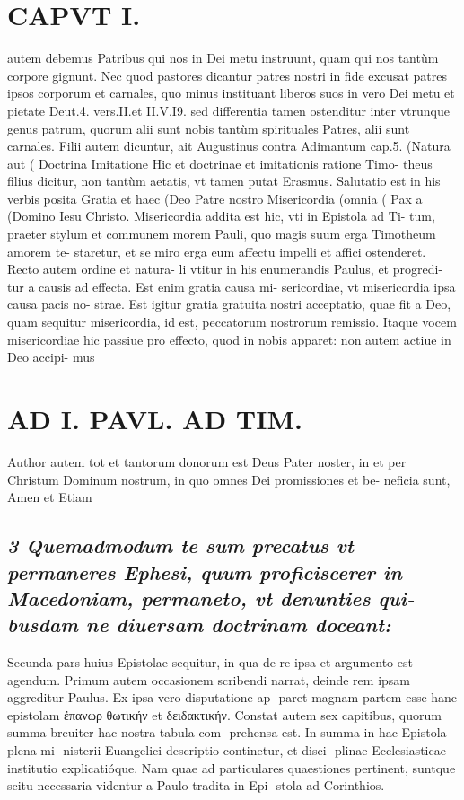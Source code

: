 \documentclass{article}
\begin{document}
\begin{pages}
\section*{CAPVT I. }
\marginpar{[ p.5 ]}\pstart autem debemus Patribus qui nos in Dei metu instruunt, quam qui nos tantùm corpore gignunt. Nec quod pastores dicantur patres nostri in fide excusat patres ipsos corporum et carnales, quo minus instituant liberos suos in vero Dei metu et pietate Deut.4. vers.II.et II.V.I9. sed differentia tamen ostenditur inter vtrunque genus patrum, quorum alii sunt nobis tantùm spirituales Patres, alii sunt carnales.  \pend\pstart Filii autem dicuntur, ait Augustinus contra Adimantum cap.5. (Natura aut ( Doctrina Imitatione Hic et doctrinae et imitationis ratione Timo- theus filius dicitur, non tantùm aetatis, vt tamen putat Erasmus. Salutatio est in his verbis posita Gratia et haec (Deo Patre nostro Misericordia (omnia ( Pax a (Domino Iesu Christo. Misericordia addita est hic, vti in Epistola ad Ti- tum, praeter stylum et communem morem Pauli, quo magis suum erga Timotheum amorem te- staretur, et se miro erga eum affectu impelli et affici ostenderet. Recto autem ordine et natura- li vtitur in his enumerandis Paulus, et progredi- tur a causis ad effecta. Est enim gratia causa mi- sericordiae, vt misericordia ipsa causa pacis no- strae. Est igitur gratia gratuita nostri acceptatio, quae fit a Deo, quam sequitur misericordia, id est, peccatorum nostrorum remissio. Itaque vocem misericordiae hic passiue pro effecto, quod in nobis apparet: non autem actiue in Deo accipi- mus  \pend
\section*{AD I. PAVL. AD TIM. }
\marginpar{[ p.6 ]}\pstart Author autem tot et tantorum donorum est Deus Pater noster, in et per Christum Dominum nostrum, in quo omnes Dei promissiones et be- neficia sunt, Amen et Etiam  \pend
{}
{}
\subsection*{\textit{3 Quemadmodum te sum precatus vt permaneres Ephesi, quum proficiscerer in Macedoniam, permaneto, vt denunties qui- busdam ne diuersam doctrinam doceant: }}\pstart Secunda pars huius Epistolae sequitur, in qua de re ipsa et argumento est agendum. Primum autem occasionem scribendi narrat, deinde rem ipsam aggreditur Paulus. Ex ipsa vero disputatione ap- paret magnam partem esse hanc epistolam ἐπανωρ θωτικήν et δειδακτικήν. Constat autem sex capitibus, quorum summa breuiter hac nostra tabula com- prehensa est. In summa in hac Epistola plena mi- nisterii Euangelici descriptio continetur, et disci- plinae Ecclesiasticae institutio explicatióque. Nam quae ad particulares quaestiones pertinent, suntque  scitu necessaria videntur a Paulo tradita in Epi- stola ad Corinthios.  \pend

\end{pages}
\end{document}
